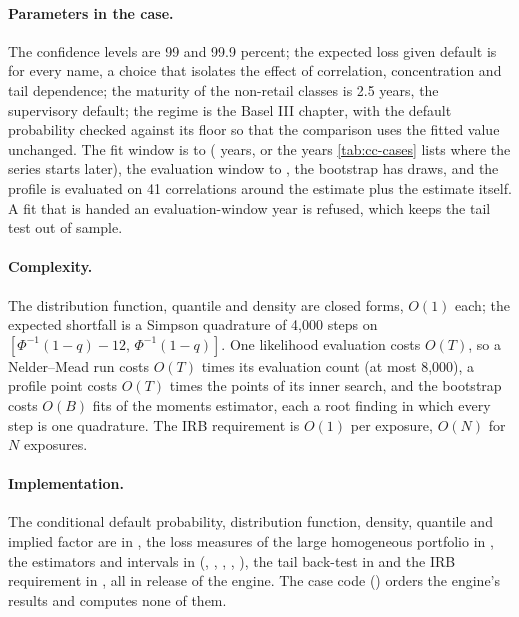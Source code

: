 \paragraph{Parameters in the case.} The confidence levels are 99 and 99.9 percent; the expected loss given default is \ccLgd{} for every
name, a choice that isolates the effect of correlation, concentration and tail dependence; the maturity of the non-retail classes is 2.5
years, the supervisory default; the regime is the Basel III chapter, with the default probability checked against its floor so that the
comparison uses the fitted value unchanged. The fit window is \ccFitFirst{} to \ccFitLast{} (\ccFitYears{} years, or the years
\cref{tab:cc-cases} lists where the series starts later), the evaluation window \ccEvFirst{} to \ccEvLast{}, the bootstrap has \ccBoot{}
draws, and the profile is evaluated on 41 correlations around the estimate plus the estimate itself. A fit that is handed an
evaluation-window year is refused, which keeps the tail test out of sample.

\paragraph{Complexity.} The distribution function, quantile and density are closed forms, $O(1)$ each; the expected shortfall is a
Simpson quadrature of 4,000 steps on $[\Phi^{-1}(1-q)-12,\,\Phi^{-1}(1-q)]$. One likelihood evaluation costs $O(T)$, so a
Nelder--Mead run costs $O(T)$ times its evaluation count (at most 8,000), a profile point costs $O(T)$ times the points of its inner
search, and the bootstrap costs $O(B)$ fits of the moments estimator, each a root finding in which every step is one quadrature. The IRB
requirement is $O(1)$ per exposure, $O(N)$ for $N$ exposures.

\paragraph{Implementation.} The conditional default probability, distribution function, density, quantile and implied factor are in
, the loss measures of the large homogeneous portfolio in
, the estimators and intervals in 
(, , , , ), the
tail back-test in  and the IRB requirement in
, all in release \ccEngine{} of the engine. The case code
() orders the engine's results and computes none of them.

